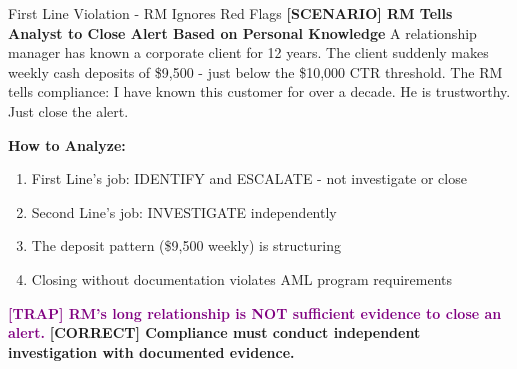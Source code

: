\documentclass[11pt,a4paper]{beamer}
\newcommand{\trap}[1]{\textcolor{purple}{\textbf{[TRAP] #1}}}
\newcommand{\correct}[1]{\textcolor{green!50!black}{\textbf{[CORRECT] #1}}}
\newcommand{\scenario}[1]{\textcolor{blue!70!black}{\textbf{[SCENARIO] #1}}}
\begin{document}
	\begin{frame}{First Line Violation - RM Ignores Red Flags}
		\scenario{RM Tells Analyst to Close Alert Based on Personal Knowledge}
		A relationship manager has known a corporate client for 12 years. The client suddenly makes weekly cash deposits of \$9,500 - just below the \$10,000 CTR threshold. The RM tells compliance: I have known this customer for over a decade. He is trustworthy. Just close the alert.
		
		\vspace{0.1cm}
		\textbf{How to Analyze:}
		\begin{enumerate}
			\item First Line's job: IDENTIFY and ESCALATE - not investigate or close
			\item Second Line's job: INVESTIGATE independently
			\item The deposit pattern (\$9,500 weekly) is structuring
			\item Closing without documentation violates AML program requirements
		\end{enumerate}
		\trap{RM's long relationship is NOT sufficient evidence to close an alert.}
		\correct{Compliance must conduct independent investigation with documented evidence.}
	\end{frame}
	
\end{document}
